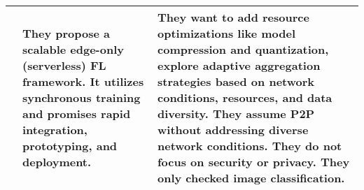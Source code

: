 \begin{changemargin}{-2cm}{0cm}
\begin{tabular}{|c||m{0.4\paperwidth}|m{0.4\paperwidth}|}
        \\
        \hline
            \cite{paper:edgefl_framework}
            &
            They propose a scalable edge-only (serverless) FL framework.
            It utilizes synchronous training and promises rapid integration, prototyping, and deployment.
            &
            They want to add resource optimizations like model compression and quantization,
            explore adaptive aggregation strategies based on network conditions, resources, and data diversity.
            They assume P2P without addressing diverse network conditions.
            They do not focus on security or privacy.
            They only checked image classification.
        \\
        \hline
    \end{tabular}
\end{changemargin}











